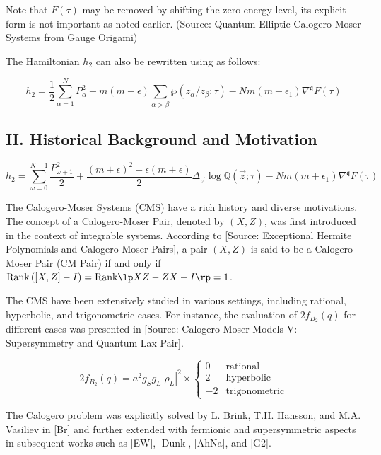 \documentclass[12pt]{article}
\begin{document}
Note that $F(\tau)$ may be removed by shifting the zero energy level, its explicit form is not important as noted earlier. (Source: Quantum Elliptic Calogero-Moser Systems from Gauge Origami)

The Hamiltonian $h_2$ can also be rewritten using \cite{Sharp Hardy-Rellich Type Inequalities Associated with Dunkl Operators} as follows:

\begin{equation}
    h_2 = \frac{1}{2}\sum_{\alpha=1}^N{P_\alpha^2}+m(m+\epsilon)\sum_{\alpha>\beta}\wp(z_\alpha/z_\beta;\tau)-Nm(m+\epsilon_1)\nabla^\mathfrak{q}F(\tau)
\end{equation}

\subsection{II. Historical Background and Motivation}
 \begin{equation}
h_2 = \sum_{\omega=0}^{N-1}\frac{P_{\omega+1}^2}{2}+\frac{(m+\epsilon)^2-\epsilon(m+\epsilon)}{2}\Delta_{\vec{z}}\log\mathbb{Q}(\vec{z};\tau)- Nm(m+\epsilon_1)\nabla^\mathfrak{q}F(\tau)
\end{equation}

The Calogero-Moser Systems (CMS) have a rich history and diverse motivations. The concept of a Calogero-Moser Pair, denoted by $\left(X,Z \right)$, was first introduced in the context of integrable systems. According to [Source: Exceptional Hermite Polynomials and Calogero-Moser Pairs], a pair $\left(X,Z \right)$ is said to be a Calogero-Moser Pair (CM Pair) if and only if $\text{Rank}\left( [X,Z] - I \right)=\text{Rank}\lp XZ-ZX-I \rp=1$.

The CMS have been extensively studied in various settings, including rational, hyperbolic, and trigonometric cases. For instance, the evaluation of $2f_{B_{2}}(q)$ for different cases was presented in [Source: Calogero-Moser Models V: Supersymmetry and Quantum Lax Pair].

\begin{equation}
   2f_{B_{2}}(q)=a^2g_Sg_L|\rho_L|^2\times
   \left\{
   \begin{array}{rl}
      0& \mbox{rational}\\
      2&\mbox{hyperbolic}\\
      -2&\mbox{trigonometric}
   \end{array}\right.
\end{equation}

The Calogero problem was explicitly solved by L. Brink, T.H. Hansson, and M.A. Vasiliev in [Br] and further extended with fermionic and supersymmetric aspects in subsequent works such as [EW], [Dunk], [AhNa], and [G2].
\end{document}
